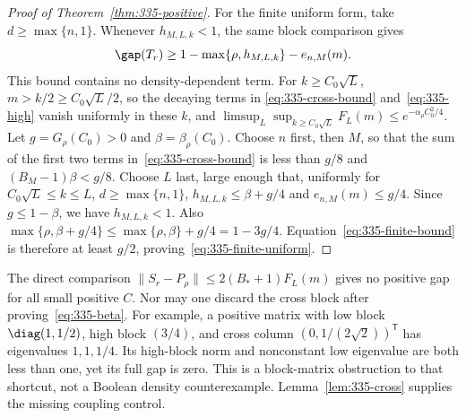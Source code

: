 \begin{proof}[Proof of Theorem~\ref{thm:335-positive}]
For the finite uniform form, take $d\ge\max\{n,1\}$. Whenever
$h_{M,L,k}<1$, the same block comparison gives
\begin{equation}\label{eq:335-finite-bound}
 \gap(T_r)\ge1-\max\{\rho,h_{M,L,k}\}-e_{n,M}(m).
\end{equation}
This bound contains no density-dependent term. For $k\ge C_0\sqrt L$,
$m>k/2\ge C_0\sqrt L/2$, so the decaying terms in
\eqref{eq:335-cross-bound} and~\eqref{eq:335-high} vanish uniformly
in these $k$, and
$\limsup_L\sup_{k\ge C_0\sqrt L}F_L(m)\le e^{-\alpha_\rho C_0^2/4}$.
Let $g=G_\rho(C_0)>0$ and $\beta=\beta_\rho(C_0)$.
Choose $n$ first, then $M$, so that the sum of the first two terms
in~\eqref{eq:335-cross-bound} is less than $g/8$ and
$(B_M-1)\beta<g/8$. Choose $L$ last, large enough that, uniformly
for $C_0\sqrt L\le k\le L$, $d\ge\max\{n,1\}$,
$h_{M,L,k}\le\beta+g/4$ and $e_{n,M}(m)\le g/4$.
Since $g\le1-\beta$, we have $h_{M,L,k}<1$. Also
$\max\{\rho,\beta+g/4\}\le\max\{\rho,\beta\}+g/4=1-3g/4$.
Equation~\eqref{eq:335-finite-bound} is therefore at least $g/2$,
proving~\eqref{eq:335-finite-uniform}.
\end{proof}

\begin{remark}
The direct comparison $\|S_r-P_\rho\|\le2(B_*+1)F_L(m)$ gives no
positive gap for all small positive $C$. Nor may one discard the cross
block after proving~\eqref{eq:335-beta}. For example, a positive matrix
with low block $\diag(1,1/2)$, high block $(3/4)$, and cross column
$(0,1/(2\sqrt2))^{\mathsf T}$ has eigenvalues $1,1,1/4$.
Its high-block norm and nonconstant low eigenvalue are both less than
one, yet its full gap is zero. This is a block-matrix obstruction to
that shortcut, not a Boolean density counterexample.
Lemma~\ref{lem:335-cross} supplies the missing coupling control.
\end{remark}

